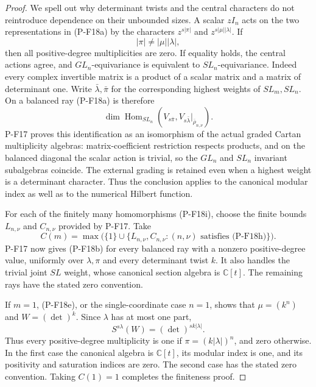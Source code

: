 \begin{proof}
We spell out why determinant twists and the central characters do
not reintroduce dependence on their unbounded sizes. A scalar
$zI_n$ acts on the two representations in (P-F18a) by the
characters $z^{s|\pi|}$ and $z^{s|\mu||\lambda|}$.
If
\[
 |\pi|\ne |\mu||\lambda|,
 \tag{P-F18j}
\]
then all positive-degree multiplicities are zero. If equality
holds, the central actions agree, and $GL_n$-equivariance is
equivalent to $SL_n$-equivariance. Indeed every complex invertible
matrix is a product of a scalar matrix and a matrix of determinant
one. Write $\bar\lambda,\bar\pi$ for the corresponding highest
weights of $SL_m,SL_n$. On a balanced ray (P-F18a) is therefore
\[
 \dim\operatorname{Hom}_{SL_n}
  \left(V_{s\bar\pi},
       V_{s\bar\lambda}|_{\overline\rho_{n,\nu}}\right).
 \tag{P-F18k}
\]
P-F17 proves this identification as an isomorphism of the actual
graded Cartan multiplicity algebras: matrix-coefficient restriction
respects products, and on the balanced diagonal the scalar action
is trivial, so the $GL_n$ and $SL_n$ invariant subalgebras coincide.
The external grading is retained even when a highest weight is a
determinant character. Thus the conclusion applies to the canonical
modular index as well as to the numerical Hilbert function.

For each of the finitely many homomorphisms (P-F18i), choose the
finite bounds $L_{n,\nu}$ and $C_{n,\nu}$ provided by P-F17.
Take
\[
 C(m)=\max\bigl(\{1\}\cup
       \{L_{n,\nu},C_{n,\nu}:(n,\nu)\text{ satisfies (P-F18h)}\}\bigr).
 \tag{P-F18l}
\]
P-F17 now gives (P-F18b) for every balanced ray with a nonzero
positive-degree value, uniformly over $\lambda,\pi$ and every
determinant twist $k$. It also handles the trivial joint $SL$
weight, whose canonical section algebra is $\mathbb C[t]$.
The remaining rays have the stated zero convention.

If $m=1$, (P-F18e), or the single-coordinate case $n=1$, shows
that $\mu=(k^n)$ and $W=(\det)^k$. Since $\lambda$ has at most
one part,
\[
 S^{s\lambda}(W)=(\det)^{sk|\lambda|}.
\]
Thus every positive-degree multiplicity is one if
$\pi=(k|\lambda|)^n$, and zero otherwise. In the first case the
canonical algebra is $\mathbb C[t]$, its modular index is one,
and its positivity and saturation indices are zero. The second
case has the stated zero convention. Taking $C(1)=1$ completes
the finiteness proof.


\end{proof}
